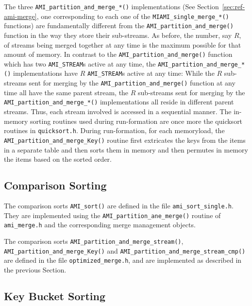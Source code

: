 The three \verb|AMI_partition_and_merge_*()| implementations (See Section~\ref{sec:ref-ami-merge}, one corresponding to each one of the \verb|MIAMI_single_merge_*()| functions) are
fundamentally  different from the \verb|AMI_partition_and_merge()| function in the way they store
their  sub-streams. As before, the number, say $R$,  of streams being merged together 
at any time is the maximum possible for that amount of memory. In contrast to the 
\verb|AMI_partition_and_merge()| function which has two \verb|AMI_STREAM|s active at
any time, the \verb|AMI_partition_and_merge_*()| implementations have $R$  \verb|AMI_STREAM|s 
active at any time: While the $R$ sub-streams
sent for merging by the \verb|AMI_partition_and_merge()| function at any time 
all have the same parent stream, the $R$ sub-streams sent for merging  by the 
 \verb|AMI_partition_and_merge_*()| implementations all reside in different
parent streams. Thus, each stream involved is accessed in a sequential manner.
The in-memory sorting routines used during run-formation are once more the 
quicksort routines in \verb|quicksort.h|. During run-formation, for each memoryload, 
the \verb|AMI_partition_and_merge_Key()| routine 
first extricates the keys from the items in a separate table and then sorts them 
in memory and then permutes in memory the items based on the sorted order.


\subsection{Comparison Sorting}
\label{sec:ref-imp-ami-sort}

The comparison sorts \verb|AMI_sort()| are defined in the file \verb|ami_sort_single.h|.
They are implemented using the \verb|AMI_partition_ane_merge()| routine of 
\verb|ami_merge.h| and the corresponding merge management objects.

The comparison sorts \verb|AMI_partition_and_merge_stream()|, \verb|AMI_partition_and_merge_Key()| and  \verb|AMI_partition_and_merge_stream_cmp()| are defined in the file
\verb|optimized_merge.h|, and are implemented as described in the previous 
Section.



\subsection{Key Bucket Sorting}
\label{sec:ref-imp-ami-kb-sort}

